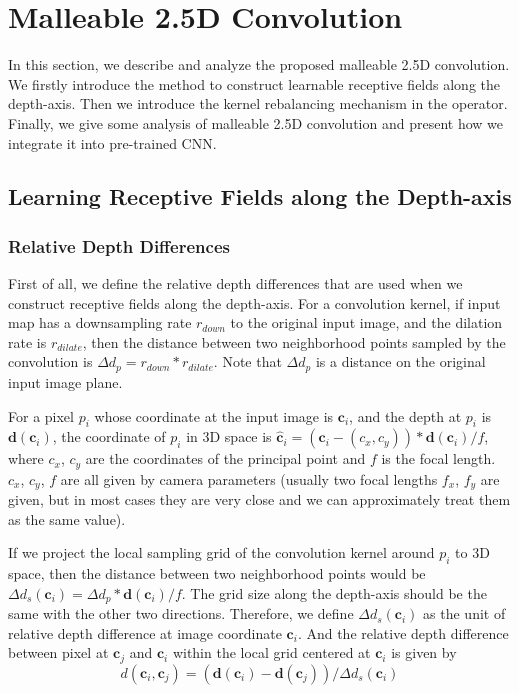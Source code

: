 \documentclass[runningheads]{llncs}
\begin{document}
\section{Malleable 2.5D Convolution}
In this section, we describe and analyze the proposed malleable 2.5D convolution.
We firstly introduce the method to construct learnable receptive fields along the depth-axis.
Then we introduce the kernel rebalancing mechanism in the operator.
Finally, we give some analysis of malleable 2.5D convolution and present how we integrate it into pre-trained CNN.

\subsection{Learning Receptive Fields along the Depth-axis}
\subsubsection{Relative Depth Differences}
First of all, we define the relative depth differences that are used when we construct receptive fields along the depth-axis.
For a convolution kernel, if input map has a downsampling rate $r_{down}$ to the original input image, and the dilation rate is $r_{dilate}$, then the distance between two neighborhood points sampled by the convolution is $\Delta d_p = r_{down} * r_{dilate}$.
Note that $\Delta d_p$ is a distance on the original input image plane.

For a pixel $p_i$ whose coordinate at the input image is $\mathbf{c}_i$, and the depth at $p_i$ is $\mathbf{d}(\mathbf{c}_i)$,
the coordinate of $p_i$ in 3D space is $\mathbf{\hat{c}}_i = (\mathbf{c}_i - (c_x, c_y)) * \mathbf{d}(\mathbf{c}_i) / f$,
where $c_x$, $c_y$ are the coordinates of the principal point and $f$ is the focal length.
$c_x$, $c_y$, $f$ are all given by camera parameters (usually two focal lengths $f_x$, $f_y$ are given, but in most cases they are very close and we can approximately treat them as the same value).

If we project the local sampling grid of the convolution kernel around $p_i$ to 3D space, then the distance between two neighborhood points would be $\Delta d_s(\mathbf{c}_i) = \Delta d_p * \mathbf{d}(\mathbf{c}_i) / f$.
The grid size along the depth-axis should be the same with the other two directions.
Therefore, we define $\Delta d_s(\mathbf{c}_i)$ as the unit of relative depth difference at image coordinate $\mathbf{c}_i$.
And the relative depth difference between pixel at $\mathbf{c}_j$ and $\mathbf{c}_i$ within the local grid centered at $\mathbf{c}_i$ is given by
\begin{equation}
  d(\mathbf{c}_i, \mathbf{c}_j) = (\mathbf{d}(\mathbf{c}_i)-\mathbf{d}(\mathbf{c}_j))/\Delta d_s(\mathbf{c}_i)
\end{equation}
\end{document}
